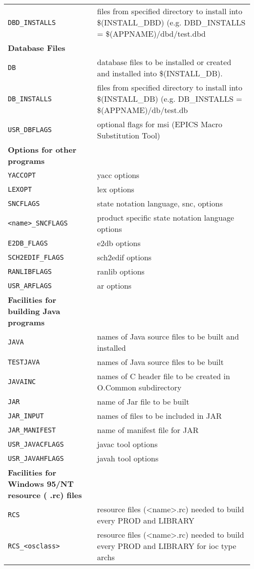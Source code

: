 \begin{center}
\begin{longtable}{p{2.94784in}p{3.76247in}}
\verb|DBD_INSTALLS| & files from specified directory to install into \$(INSTALL\_DBD) (e.g. DBD\_INSTALLS = \$(APPNAME)/dbd/test.dbd\\
\textbf{Database Files} & \\
\hline
\verb|DB| & database files to be installed or created and installed into \$(INSTALL\_DB).\\
\verb|DB_INSTALLS| & files from specified directory to install into \$(INSTALL\_DB) (e.g. DB\_INSTALLS = \$(APPNAME)/db/test.db\\
\verb|USR_DBFLAGS| & optional flags for msi (EPICS Macro Substitution Tool)\\
\textbf{Options for other programs} &    \\
\hline
\verb|YACCOPT| & yacc options\\
\verb|LEXOPT| & lex options\\
\verb|SNCFLAGS| & state notation language, snc, options\\
\verb|<name>_SNCFLAGS| & product specific state notation language options\\
\verb|E2DB_FLAGS| & e2db options\\
\verb|SCH2EDIF_FLAGS| & sch2edif options\\
\verb|RANLIBFLAGS| & ranlib options\\
\verb|USR_ARFLAGS| & ar options\\
\textbf{Facilities for building Java programs} &    \\
\hline
\verb|JAVA| & names of Java source files to be built and installed\\
\verb|TESTJAVA| & names of Java source files to be built\\
\verb|JAVAINC| & names of C header file to be created in O.Common subdirectory\\
\verb|JAR| & name of Jar file to be built\\
\verb|JAR_INPUT| & names of files to be included in JAR\\
\verb|JAR_MANIFEST| & name of manifest file for JAR\\
\verb|USR_JAVACFLAGS| & javac tool options\\
\verb|USR_JAVAHFLAGS| & javah tool options\\
\textbf{Facilities for Windows 95/NT resource ( .rc) files} &    \\
\hline
\verb|RCS| & resource files (\textless{}name\textgreater{}.rc) needed to build every PROD and LIBRARY\\
\verb|RCS_<osclass>| & resource files (\textless{}name\textgreater{}.rc) needed to build every PROD and LIBRARY for ioc type archs\\

\end{longtable}
\end{center}
